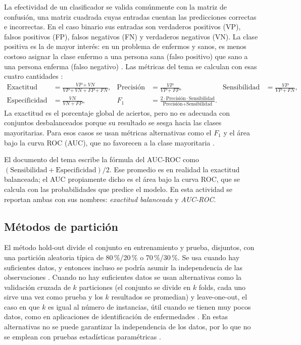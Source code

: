 \documentclass[11pt,letterpaper]{article}
\begin{document}
La efectividad de un clasificador se valida comúnmente con la matriz de confusión, una matriz cuadrada cuyas entradas cuentan las predicciones correctas e incorrectas. En el caso binario sus entradas son verdaderos positivos (VP), falsos positivos (FP), falsos negativos (FN) y verdaderos negativos (VN). La clase positiva es la de mayor interés: en un problema de enfermos y sanos, es menos costoso asignar la clase enfermo a una persona sana (falso positivo) que sano a una persona enferma (falso negativo) \parencite{tecnm2026_tema33}. Las métricas del tema se calculan con esas cuatro cantidades \parencite{tecnm2026_tema33}:
\begin{align*}
\text{Exactitud} &= \frac{VP + VN}{VP + VN + FP + FN}, &
\text{Precisión} &= \frac{VP}{VP + FP}, &
\text{Sensibilidad} &= \frac{VP}{VP + FN},\\
\text{Especificidad} &= \frac{VN}{VN + FP}, &
F_1 &= \frac{2 \cdot \text{Precisión} \cdot \text{Sensibilidad}}{\text{Precisión} + \text{Sensibilidad}}.
\end{align*}
La exactitud es el porcentaje global de aciertos, pero no es adecuada con conjuntos desbalanceados porque su resultado se sesga hacia las clases mayoritarias. Para esos casos se usan métricas alternativas como el $F_1$ y el área bajo la curva ROC (AUC), que no favorecen a la clase mayoritaria \parencite{tecnm2026_tema33}.

El documento del tema escribe la fórmula del AUC-ROC como $(\text{Sensibilidad} + \text{Especificidad})/2$. Ese promedio es en realidad la exactitud balanceada; el AUC propiamente dicho es el área bajo la curva ROC, que se calcula con las probabilidades que predice el modelo. En esta actividad se reportan ambas con sus nombres: \textit{exactitud balanceada} y \textit{AUC-ROC}.

\subsection{Métodos de partición}

El método hold-out divide el conjunto en entrenamiento y prueba, disjuntos, con una partición aleatoria típica de 80\,\%/20\,\% o 70\,\%/30\,\%. Se usa cuando hay suficientes datos, y entonces incluso se podría asumir la independencia de las observaciones \parencite{tecnm2026_tema33}. Cuando no hay suficientes datos se usan alternativas como la validación cruzada de $k$ particiones (el conjunto se divide en $k$ folds, cada uno sirve una vez como prueba y los $k$ resultados se promedian) y leave-one-out, el caso en que $k$ es igual al número de instancias, útil cuando se tienen muy pocos datos, como en aplicaciones de identificación de enfermedades \parencite{tecnm2026_tema33}. En estas alternativas no se puede garantizar la independencia de los datos, por lo que no se emplean con pruebas estadísticas paramétricas \parencite{tecnm2026_tema33}.
\end{document}
